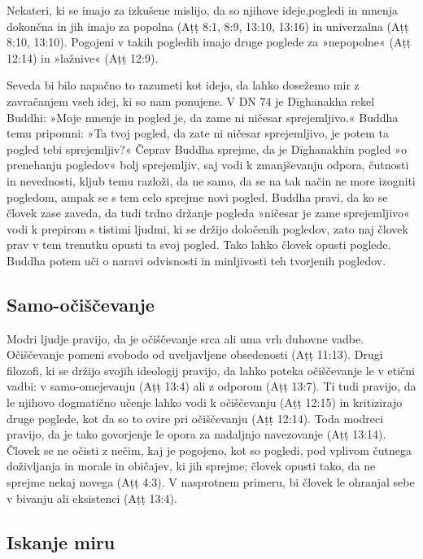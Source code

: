Nekateri, ki se imajo za izkušene mislijo, da so njihove ideje,pogledi
in mnenja dokončna in jih imajo za popolna (Aṭṭ 8:1, 8:9, 13:10, 13:16)
in univerzalna (Aṭṭ 8:10, 13:10). Pogojeni v takih pogledih imajo druge
poglede za »nepopolne« (Aṭṭ 12:14) in »lažnive« (Aṭṭ 12:9).

Seveda bi bilo napačno to razumeti kot idejo, da lahko dosežemo mir z
zavračanjem vseh idej, ki so nam ponujene. V DN 74 je Dīghanakha rekel
Buddhi: »Moje mnenje in pogled je, da zame ni ničesar sprejemljivo.«
Buddha temu pripomni: »Ta tvoj pogled, da zate ni ničesar sprejemljivo,
je potem ta pogled tebi sprejemljiv?« Čeprav Buddha sprejme, da je
Dīghanakhin pogled »o prenehanju pogledov« bolj sprejemljiv, saj vodi k
zmanjševanju odpora, čutnosti in nevednosti, kljub temu razloži, da ne
samo, da se na tak način ne more izogniti pogledom, ampak se s tem celo
sprejme novi pogled. Buddha pravi, da ko se človek zase zaveda, da tudi
trdno držanje pogleda »ničesar je zame sprejemljivo« vodi k prepirom s
tistimi ljudmi, ki se držijo določenih pogledov, zato naj človek prav v
tem trenutku opusti ta svoj pogled. Tako lahko človek opusti poglede.
Buddha potem uči o naravi odvisnosti in minljivosti teh tvorjenih
pogledov.

\subsection{Samo-očiščevanje}

Modri ljudje pravijo, da je
očiščevanje srca ali uma vrh duhovne vadbe. Očiščevanje pomeni svobodo
od uveljavljene obsedenosti (Aṭṭ 11:13). Drugi filozofi, ki se držijo
svojih ideologij pravijo, da lahko poteka očiščevanje le v etični vadbi:
v samo-omejevanju (Aṭṭ 13:4) ali z odporom (Aṭṭ 13:7). Ti tudi pravijo,
da le njihovo dogmatično učenje lahko vodi k očiščevanju (Aṭṭ 12:15) in
kritizirajo druge poglede, kot da so to ovire pri očiščevanju (Aṭṭ
12:14). Toda modreci pravijo, da je tako govorjenje le opora za
nadaljnjo navezovanje (Aṭṭ 13:14). Človek se ne očisti z nečim, kaj je
pogojeno, kot so pogledi, pod vplivom čutnega doživljanja in morale in
običajev, ki jih sprejme; človek opusti tako, da ne sprejme nekaj novega
(Aṭṭ 4:3). V nasprotnem primeru, bi človek le ohranjal sebe v bivanju
ali eksistenci (Aṭṭ 13:4).

\subsection{Iskanje miru}

